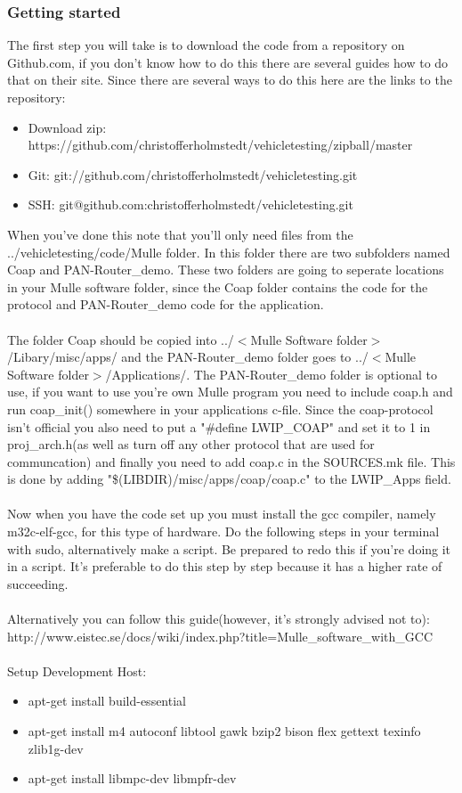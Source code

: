 \subsubsection{Getting started}
The first step you will take is to download the code from a repository on Github.com, if you don't know how to do this there are several guides how to do that on their site. Since there are several ways to do this here are the links to the repository:
\begin{itemize}
\item Download zip: https://github.com/christofferholmstedt/vehicletesting/zipball/master
\item Git: git://github.com/christofferholmstedt/vehicletesting.git
\item SSH: git@github.com:christofferholmstedt/vehicletesting.git
\end{itemize}
When you've done this note that you'll only need files from the ../vehicletesting/code/Mulle folder.
In this folder there are two subfolders named Coap and PAN-Router\_demo. 
These two folders are going to seperate locations in your Mulle software folder, 
since the Coap folder contains the code for the protocol and PAN-Router\_demo code for the application. 
\\\\
The folder Coap should be copied into ../$<$Mulle Software folder$>$/Libary/misc/apps/ 
and the PAN-Router\_demo folder goes to  ../$<$Mulle Software folder$>$/Applications/. 
The PAN-Router\_demo folder is optional to use, if you want to use you're own Mulle program you need to include coap.h and run coap\_init() somewhere in your applications c-file. 
Since the coap-protocol isn't official you also need to put a "\#define LWIP\_COAP" and set it to 1 in proj\_arch.h(as well as turn off any other protocol that are used for communcation) 
and finally you need to add coap.c in the SOURCES.mk file. This is done by adding "\$(LIBDIR)/misc/apps/coap/coap.c" to the LWIP\_Apps field.
\\\\
Now when you have the code set up you must install the gcc compiler, namely m32c-elf-gcc, for this type of hardware. Do the following steps in your terminal with sudo, alternatively make a script. Be prepared to redo this if you're doing it in a script. It's preferable to do this step by step because it has a higher rate of succeeding. 
\\\\
Alternatively you can follow this guide(however, it's strongly advised not to): http://www.eistec.se/docs/wiki/index.php?title=Mulle\_software\_with\_GCC
\\\\
Setup Development Host:
\begin{itemize}
\item apt-get install build-essential
\item apt-get install m4 autoconf libtool gawk bzip2 bison flex gettext texinfo zlib1g-dev 
\item apt-get install libmpc-dev libmpfr-dev
\end{itemize}

